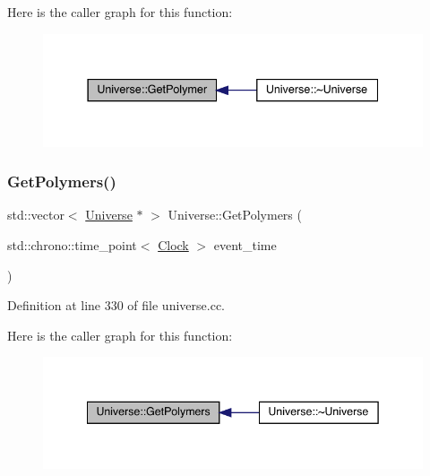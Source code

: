 Here is the caller graph for this function\+:
\nopagebreak
\begin{figure}[H]
\begin{center}
\leavevmode
\includegraphics[width=337pt]{class_universe_a2d5d3924a7d7ffd2a5f47be9f137d86e_icgraph}
\end{center}
\end{figure}
\mbox{\label{class_universe_aac5d1c1a3a3ba56c8ca7115a85b2c239}} 
\subsubsection{\texorpdfstring{Get\+Polymers()}{GetPolymers()}}
{\footnotesize\ttfamily std\+::vector$<$ \hyperlink{class_universe}{Universe} $\ast$ $>$ Universe\+::\+Get\+Polymers (\begin{DoxyParamCaption}\item[{std\+::chrono\+::time\+\_\+point$<$ \hyperlink{universe_8h_a0ef8d951d1ca5ab3cfaf7ab4c7a6fd80}{Clock} $>$}]{event\+\_\+time }\end{DoxyParamCaption})}



Definition at line 330 of file universe.\+cc.

Here is the caller graph for this function\+:
\nopagebreak
\begin{figure}[H]
\begin{center}
\leavevmode
\includegraphics[width=342pt]{class_universe_aac5d1c1a3a3ba56c8ca7115a85b2c239_icgraph}
\end{center}
\end{figure}
\mbox{\label{class_universe_a9f7b74fc21d45ddaa78aa18e9a337bcd}} 
